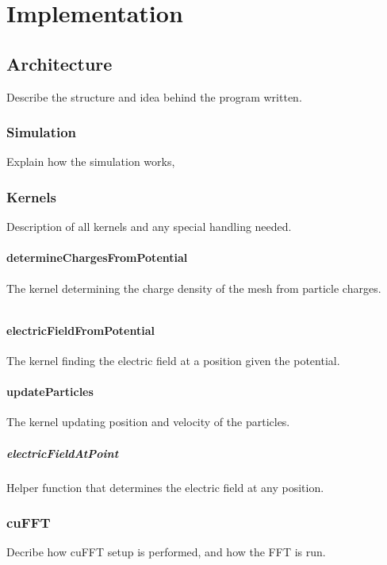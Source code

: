 \chapter{Implementation}
\section{Architecture}
Describe the structure and idea behind the program written.


\subsection{Simulation}
Explain how the simulation works, 


\subsection{Kernels}
Description of all kernels and any special handling needed.

\subsubsection{determineChargesFromPotential}
The kernel determining the charge density of the mesh from particle charges.
\begin{lstlisting}
\end{lstlisting}

\subsubsection{electricFieldFromPotential}
The kernel finding the electric field at a position given the potential.

\subsubsection{updateParticles}
The kernel updating position and velocity of the particles.
\paragraph{electricFieldAtPoint}
Helper function that determines the electric field at any position.


\subsection{cuFFT}
Decribe how cuFFT setup is performed, and how the FFT is run.
